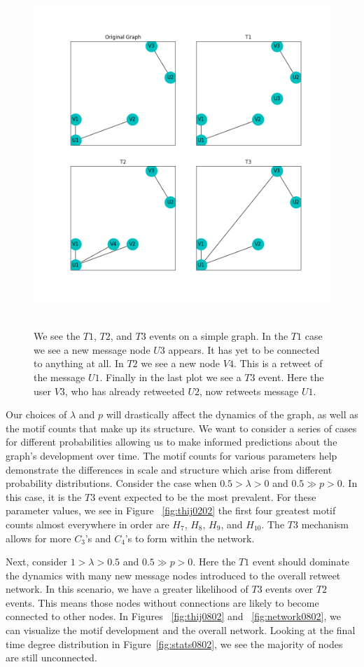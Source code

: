 \begin{figure}
    \includegraphics[width=12cm]{Images/events.png}\
    \centering
    \caption{We see the $T1$, $T2$, and $T3$ events on a simple graph. In the $T1$ case 
    we see a new message node $U3$ appears. It has yet to be connected to anything at all. In $T2$
    we see a new node $V4$. This is a retweet of the message $U1$. Finally in the last plot we see
    a $T3$ event. Here the user $V3$, who has already retweeted $U2$, now retweets message $U1$.}
\end{figure}

Our choices of $\lambda$ and $p$ will drastically affect the dynamics of the graph, as well as the motif counts that make
up its structure. We want to consider a series of cases for different probabilities allowing us to make informed predictions about the graph's development over time.
The motif counts for various parameters help demonstrate the differences in scale 
and structure which arise from different probability distributions. Consider the case when $0.5 > \lambda > 0$ and $0.5 \gg p > 0$. In this case, it is the $T3$ event
expected to be the most prevalent. For these parameter values, we see in Figure ~\ref{fig:thij0202} the first four greatest motif counts almost 
everywhere in order are $H_{7}$, $H_{8}$, $H_{9}$, and $H_{10}$. The $T3$ mechanism allows for more $C_3$'s and $C_4$'s to form within the network.

Next, consider $1>\lambda>0.5$ and $0.5 \gg p > 0$. Here the $T1$ event should dominate the dynamics
with many new message nodes introduced to the overall retweet network. In this scenario, we have
a greater likelihood of $T3$ events over $T2$ events. This means those nodes without connections are likely to become connected to other nodes. In Figures
~\ref{fig:thij0802} and ~\ref{fig:network0802}, we can visualize the motif development and the overall network. Looking at the final time degree
distribution in Figure~\ref{fig:stats0802}, we see the majority of nodes are still unconnected.


